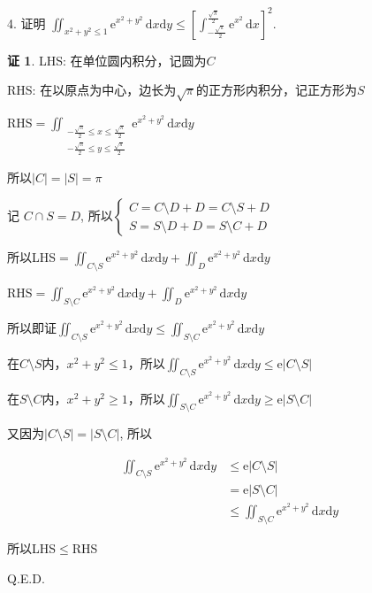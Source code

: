 \documentclass[a4paper,12pt]{article}
\theoremstyle{definition}
\newtheorem*{pf}{证}
\begin{document}
4. 证明 $\displaystyle\iint_{x^2+y^2 \leq 1} \mathrm{e}^{x^2+y^2}\,\mathrm{d}x\mathrm{d}y \leq \left[ \int_{-\frac{\sqrt{\pi}}{2}}^{\frac{\sqrt{\pi}}{2}} \mathrm{e}^{x^2}\,\mathrm{d}x \right]^2$.
\begin{pf}
    LHS: 在单位圆内积分，记圆为$C$

    RHS: 在以原点为中心，边长为$\sqrt{\pi}$的正方形内积分，记正方形为$S$

    RHS$=\iint_{\substack{-\frac{\sqrt{\pi}}{2}\leq x\leq\frac{\sqrt{\pi}}{2}\\-\frac{\sqrt{\pi}}{2}\leq y\leq\frac{\sqrt{\pi}}{2}}}\mathrm{e}^{x^2+y^2}\,\mathrm{d}x\mathrm{d}y$

    所以$|C|=|S|=\pi$

    记 $C\cap S=D$, 所以$\begin{cases}
            C=C\setminus D+D=C\setminus S+D \\
            S=S\setminus D+D=S\setminus C+D
        \end{cases}$

    所以LHS$=\iint_{C\setminus S}\mathrm{e}^{x^2+y^2}\,\mathrm{d}x\mathrm{d}y+\iint_D\mathrm{e}^{x^2+y^2}\,\mathrm{d}x\mathrm{d}y$

    RHS$=\iint_{S\setminus C}\mathrm{e}^{x^2+y^2}\,\mathrm{d}x\mathrm{d}y+\iint_D\mathrm{e}^{x^2+y^2}\,\mathrm{d}x\mathrm{d}y$

    所以即证$\iint_{C\setminus S}\mathrm{e}^{x^2+y^2}\,\mathrm{d}x\mathrm{d}y\leq\iint_{S\setminus C}\mathrm{e}^{x^2+y^2}\,\mathrm{d}x\mathrm{d}y$

    在$C\setminus S$内，$x^2+y^2\leq 1$，所以$\iint_{C\setminus S}\mathrm{e}^{x^2+y^2}\,\mathrm{d}x\mathrm{d}y\leq\mathrm{e}|C\setminus S|$

    在$S\setminus C$内，$x^2+y^2\geq 1$，所以$\iint_{S\setminus C}\mathrm{e}^{x^2+y^2}\,\mathrm{d}x\mathrm{d}y\geq\mathrm{e}|S\setminus C|$

    又因为$|C\setminus S|=|S\setminus C|$, 所以

    \begin{align*}
        \iint_{C\setminus S}\mathrm{e}^{x^2+y^2}\,\mathrm{d}x\mathrm{d}y
         & \leq\mathrm{e}|C\setminus S|                                         \\
         & =\mathrm{e}|S\setminus C|                                            \\
         & \leq\iint_{S\setminus C}\mathrm{e}^{x^2+y^2}\,\mathrm{d}x\mathrm{d}y
    \end{align*}

    所以LHS$\leq$RHS

    Q.E.D.
\end{pf}
\end{document}
